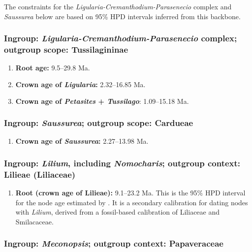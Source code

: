 \noindent The constraints for the
\textit{Ligularia-Cremanthodium-Parasenecio} complex and
\textit{Saussurea} below are based on 95\% HPD intervals inferred from
this backbone.

\subsubsection*{Ingroup: \textit{Ligularia-Cremanthodium-Parasenecio}
  complex; outgroup scope: Tussilagininae}

\begin{enumerate}

\item \textbf{Root age:} 9.5--29.8 Ma.

\item \textbf{Crown age of \textit{Ligularia}:} 2.32--16.85 Ma.

\item \textbf{Crown age of \textit{Petasites} + \textit{Tussilago}}:
  1.09--15.18 Ma.

\end{enumerate}

\subsubsection*{Ingroup: \textit{Saussurea}; outgroup scope:
  Cardueae}

\begin{enumerate}
\item \textbf{Crown age of \textit{Saussurea}:} 2.27--13.98 Ma. %
\end{enumerate}

\subsubsection*{Ingroup: \textit{Lilium}, including
  \textit{Nomocharis}; outgroup context: Lilieae (Liliaceae)}

\begin{enumerate}
\item \textbf{Root (crown age of Lilieae):} 9.1--23.2 Ma. This is the
  95\% HPD interval for the node age estimated by \citet{gao2013}. It
  is a secondary calibration for dating nodes with \textit{Lilium},
  derived from a fossil-based calibration of Liliaceae and
  Smilacaceae.
\end{enumerate}

\subsubsection*{Ingroup: \textit{Meconopsis}; outgroup context:
  Papaveraceae}

